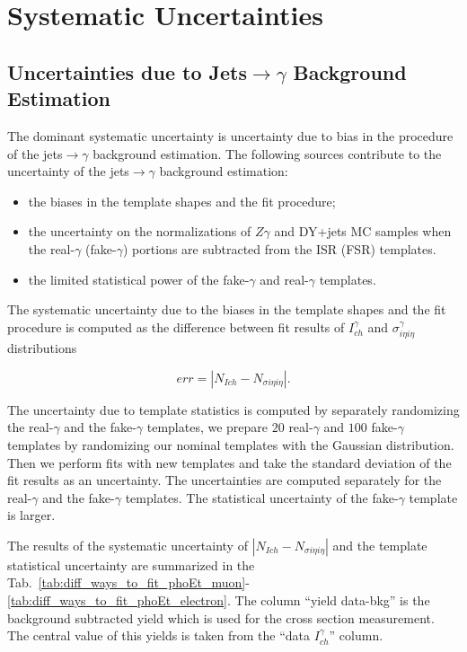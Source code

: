 \section{Systematic Uncertainties}
\label{sec:Systematics}

\subsection{Uncertainties due to Jets$\rightarrow\gamma$ Background Estimation}

The dominant systematic uncertainty is uncertainty due to bias in the procedure of the jets$\rightarrow\gamma$ background estimation. The following sources contribute to the uncertainty of  the jets$\rightarrow\gamma$ background estimation:

\begin{itemize}
  \item the biases in the template shapes and the fit procedure;
  \item the uncertainty on the normalizations of $Z\gamma$ and DY+jets MC samples when the real-$\gamma$ (fake-$\gamma$) portions are subtracted from the ISR (FSR) templates. 
  \item the limited statistical power of the fake-$\gamma$ and real-$\gamma$ templates.
\end{itemize}

The systematic uncertainty due to the biases in the template shapes and the fit procedure is computed as the difference between fit results of $I_{ch}^\gamma$ and $\sigma_{i\eta i\eta}^\gamma$ distributions

\begin{equation}
err = |N_{Ich}-N_{\sigma i\eta i\eta}|.
\end{equation}

The uncertainty due to template statistics is computed by separately randomizing the real-$\gamma$ and the fake-$\gamma$ templates, we prepare $20$ real-$\gamma$ and $100$ fake-$\gamma$ templates by randomizing our nominal templates with the Gaussian distribution. Then we perform fits with new templates and take the standard deviation of the fit results as an uncertainty. The uncertainties are computed separately for the real-$\gamma$ and the fake-$\gamma$ templates. The statistical uncertainty of the fake-$\gamma$ template is larger.

The results of the systematic uncertainty of $|N_{Ich}-N_{\sigma i\eta i\eta}|$ and the template statistical uncertainty are summarized in the Tab.~\ref{tab:diff_ways_to_fit_phoEt_muon}-\ref{tab:diff_ways_to_fit_phoEt_electron}. The column ``yield data-bkg'' is the background subtracted yield which is used for the cross section measurement. The central value of this yields is taken from the ``data $I_{ch}^{\gamma}$'' column. %

